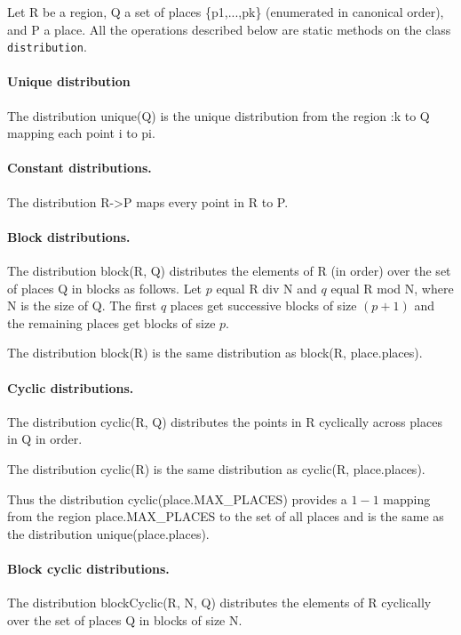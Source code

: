 Let {\cf R} be a region, {\cf Q} a set of places {\cf {}\{p1,...,pk\}}
(enumerated in canonical order), and {\cf P} a place. All the operations
described below are static methods on the class {\tt distribution}.

\paragraph{Unique distribution} 
The distribution {\cf unique(Q)} is the unique distribution from the
region {:k} to {\cf Q} mapping each point {\cf i} to {\cf pi}.

\paragraph{Constant distributions.} 
The distribution {\cf R->P} maps every point in {\cf R} to {\cf P}.

\paragraph{Block distributions.}
The distribution {\cf block(R, Q)} distributes the elements of {\cf R}
(in order) over the set of places {\cf Q} in blocks  as
follows. Let $p$ equal {\cf R div N} and $q$ equal {\cf R mod N},
where {\cf N} is the size of {\cf Q}. The first $q$ places get
successive blocks of size $(p+1)$ and the remaining places get blocks of
size $p$.

The distribution {\cf block(R)} is the same distribution as {\cf
block(R, place.places)}.

\paragraph{Cyclic distributions.} 
The distribution {\cf cyclic(R, Q)} distributes the points in {\cf R}
cyclically across places in {\cf Q} in order.

The distribution {\cf cyclic(R)} is the same distribution as {\cf 
cyclic(R, place.places)}.

Thus the distribution {\cf cyclic(place.MAX\_PLACES)} provides a $1-1$
mapping from the region {\cf place.MAX\_PLACES} to the set of all
places and is the same as the distribution {\cf unique(place.places)}.

\paragraph{Block cyclic distributions.}
The distribution {\cf blockCyclic(R, N, Q)} distributes the elements
of {\cf R} cyclically over the set of places {\cf Q} in blocks of size
{\cf N}.

